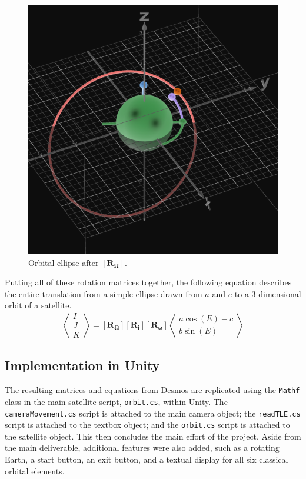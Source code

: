 \documentclass[conference]{IEEEtran}
\begin{document}
			\begin{figure}[hbtp]
				\begin{center}
					\includegraphics[width=0.8\columnwidth]{6.png}
				\end{center}
				\caption{Orbital ellipse after \( \bm{\left[R_{\Omega}\right]} \).}
				\label{figO}
			\end{figure}

			Putting all of these rotation matrices together, the following equation describes the entire translation from a simple ellipse drawn from \( a \) and \( e \) to a 3-dimensional orbit of a satellite.
			\begin{equation}
				\left\langle
					\begin{matrix}
						I\\
						J\\
						K
					\end{matrix}
				\right\rangle
				=\bm{\left[R_{\Omega}\right]}\bm{\left[R_i\right]}\bm{\left[R_{\omega}\right]}
				\left\langle
					\begin{matrix}
						a\cos{\left(E\right)}-c\\
						b\sin{\left(E\right)}
					\end{matrix}
				\right\rangle
				\label{eq4}
			\end{equation}

		\subsection{Implementation in Unity}
			The resulting matrices and equations from Desmos are replicated using the \texttt{Mathf} class in the main satellite script, \texttt{orbit.cs}, within Unity. The \texttt{cameraMovement.cs} script is attached to the main camera object; the \texttt{readTLE.cs} script is attached to the textbox object; and the \texttt{orbit.cs} script is attached to the satellite object. This then concludes the main effort of the project. Aside from the main deliverable, additional features were also added, such as a rotating Earth, a start button, an exit button, and a textual display for all six classical orbital elements.
\end{document}

